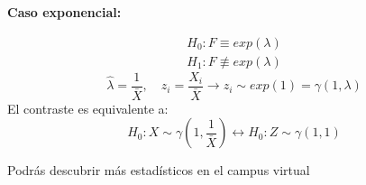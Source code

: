 \textbf{Caso exponencial:}

\[
\begin{matrix}
    H_0:F \equiv exp(\lambda) \\
    H_1:F \not\equiv exp(\lambda)
\end{matrix}
\]
\[
    \widehat{\lambda}=\frac{1}{\bar{X}}, \quad z_i
    =\frac{X_i}{\bar{X}} \to z_i \sim exp(1)=\gamma(1,\lambda)
\]
El contraste es equivalente a:
\[
    H_0: X \sim \gamma\left(1,\frac{1}{\bar{X}}\right) \longleftrightarrow H_0:Z \sim \gamma(1,1)
\]

\vspace*{5mm}

\noindent Podrás descubrir más estadísticos en el campus virtual

\newpage